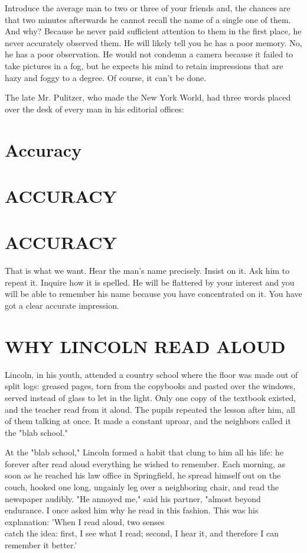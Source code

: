 \documentclass[10pt]{article}
\begin{document}
Introduce the average man to two or three of your friends and, the chances are that two minutes afterwards he cannot recall the name of a single one of them. And why? Because he never paid sufficient attention to them in the first place, he never accurately observed them. He will likely tell you he has a poor memory. No, he has a poor observation. He would not condemn a camera because it failed to take pictures in a fog, but he expects his mind to retain impressions that are hazy and foggy to a degree. Of course, it can't be done.

The late Mr. Pulitzer, who made the New York World, had three words placed over the desk of every man in his editorial offices:

\section*{Accuracy}
\section*{ACCURACY}
\section*{ACCURACY}
That is what we want. Hear the man's name precisely. Insist on it. Ask him to repeat it. Inquire how it is spelled. He will be flattered by your interest and you will be able to remember his name because you have concentrated on it. You have got a clear accurate impression.

\section*{WHY LINCOLN READ ALOUD}
Lincoln, in his youth, attended a country school where the floor was made out of split logs: greased pages, torn from the copybooks and pasted over the windows, served instead of glass to let in the light. Only one copy of the textbook existed, and the teacher read from it aloud. The pupils repeated the lesson after him, all of them talking at once. It made a constant uproar, and the neighbors called it the "blab school."

At the "blab school," Lincoln formed a habit that clung to him all his life: he forever after read aloud everything he wished to remember. Each morning, as soon as he reached his law office in Springfield, he spread himself out on the couch, hooked one long, ungainly leg over a neighboring chair, and read the newspaper audibly. "He annoyed me," said his partner, "almost beyond endurance. I once asked him why he read in this fashion. This was his explanation: 'When I read aloud, two senses\\
catch the idea: first, I see what I read; second, I hear it, and therefore I can remember it better.'
\end{document}
